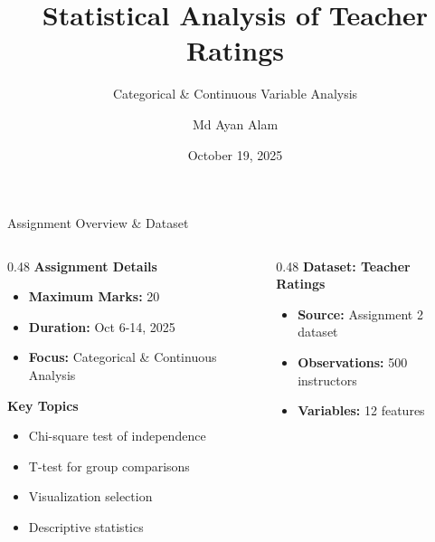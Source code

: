 \documentclass[aspectratio=169]{beamer}
\title[Assignment 4]{Statistical Analysis of Teacher Ratings}
\subtitle{Categorical \& Continuous Variable Analysis}
\author{Md Ayan Alam}
\institute{
    Roll Number: GF202342645\\
    Statistical Foundation of Data Science\\
    Assignment 4
}
\date{October 19, 2025}
\begin{document}
\begin{frame}
    \titlepage
\end{frame}

\begin{frame}{Assignment Overview \& Dataset}
    \begin{columns}[T]
        \begin{column}{0.48\textwidth}
            \textbf{Assignment Details}
            \begin{itemize}
                \item \textbf{Maximum Marks:} 20
                \item \textbf{Duration:} Oct 6-14, 2025
                \item \textbf{Focus:} Categorical \& Continuous Analysis
            \end{itemize}

            \vspace{0.5cm}

            \textbf{Key Topics}
            \begin{itemize}
                \item Chi-square test of independence
                \item T-test for group comparisons
                \item Visualization selection
                \item Descriptive statistics
            \end{itemize}
        \end{column}

        \begin{column}{0.48\textwidth}
            \textbf{Dataset: Teacher Ratings}
            \begin{itemize}
                \item \textbf{Source:} Assignment 2 dataset
                \item \textbf{Observations:} 500 instructors
                \item \textbf{Variables:} 12 features
            \end{itemize}

            \vspace{0.3cm}


\end{column}
\end{columns}
\end{frame}
\end{document}
